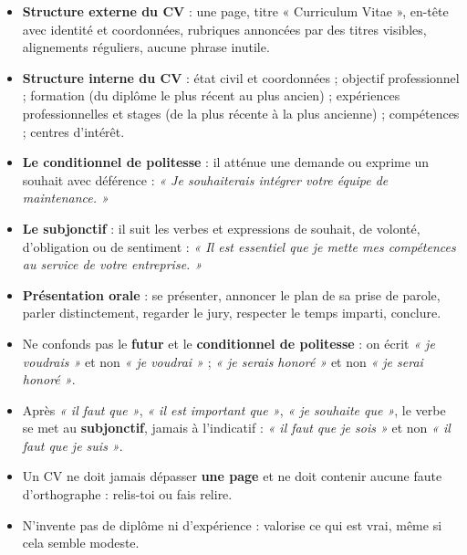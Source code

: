 \documentclass[11pt]{article}
\begin{document}
\begin{aretenir}
\begin{itemize}
\item \textbf{Structure externe du CV} : une page, titre « Curriculum Vitae », en-tête avec identité et coordonnées, rubriques annoncées par des titres visibles, alignements réguliers, aucune phrase inutile.
\item \textbf{Structure interne du CV} : état civil et coordonnées ; objectif professionnel ; formation (du diplôme le plus récent au plus ancien) ; expériences professionnelles et stages (de la plus récente à la plus ancienne) ; compétences ; centres d'intérêt.
\item \textbf{Le conditionnel de politesse} : il atténue une demande ou exprime un souhait avec déférence : \emph{« Je souhaiterais intégrer votre équipe de maintenance. »}
\item \textbf{Le subjonctif} : il suit les verbes et expressions de souhait, de volonté, d'obligation ou de sentiment : \emph{« Il est essentiel que je mette mes compétences au service de votre entreprise. »}
\item \textbf{Présentation orale} : se présenter, annoncer le plan de sa prise de parole, parler distinctement, regarder le jury, respecter le temps imparti, conclure.
\end{itemize}
\end{aretenir}

\begin{attention}
\begin{itemize}
\item Ne confonds pas le \textbf{futur} et le \textbf{conditionnel de politesse} : on écrit \emph{« je voudrais »} et non \emph{« je voudrai »} ; \emph{« je serais honoré »} et non \emph{« je serai honoré »}.
\item Après \emph{« il faut que »}, \emph{« il est important que »}, \emph{« je souhaite que »}, le verbe se met au \textbf{subjonctif}, jamais à l'indicatif : \emph{« il faut que je sois »} et non \emph{« il faut que je suis »}.
\item Un CV ne doit jamais dépasser \textbf{une page} et ne doit contenir aucune faute d'orthographe : relis-toi ou fais relire.
\item N'invente pas de diplôme ni d'expérience : valorise ce qui est vrai, même si cela semble modeste.
\end{itemize}
\end{attention}
\end{document}
